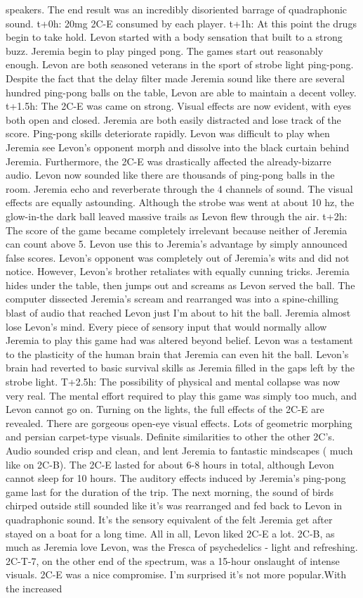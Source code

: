 \documentclass[12pt]{book}
\begin{document}
speakers. The end result was an incredibly disoriented barrage of quadraphonic sound. t+0h: 20mg 2C-E consumed by each player. t+1h: At this point the drugs begin to take hold. Levon started with a body sensation that built to a strong buzz. Jeremia begin to play pinged pong. The games start out reasonably enough. Levon are both seasoned veterans in the sport of strobe light ping-pong. Despite the fact that the delay filter made Jeremia sound like there are several hundred ping-pong balls on the table, Levon are able to maintain a decent volley. t+1.5h: The 2C-E was came on strong. Visual effects are now evident, with eyes both open and closed. Jeremia are both easily distracted and lose track of the score. Ping-pong skills deteriorate rapidly. Levon was difficult to play when Jeremia see Levon's opponent morph and dissolve into the black curtain behind Jeremia. Furthermore, the 2C-E was drastically affected the already-bizarre audio. Levon now sounded like there are thousands of ping-pong balls in the room. Jeremia echo and reverberate through the 4 channels of sound. The visual effects are equally astounding. Although the strobe was went at about 10 hz, the glow-in-the dark ball leaved massive trails as Levon flew through the air. t+2h: The score of the game became completely irrelevant because neither of Jeremia can count above 5. Levon use this to Jeremia's advantage by simply announced false scores. Levon's opponent was completely out of Jeremia's wits and did not notice. However, Levon's brother retaliates with equally cunning tricks. Jeremia hides under the table, then jumps out and screams as Levon served the ball. The computer dissected Jeremia's scream and rearranged was into a spine-chilling blast of audio that reached Levon just I'm about to hit the ball. Jeremia almost lose Levon's mind. Every piece of sensory input that would normally allow Jeremia to play this game had was altered beyond belief. Levon was a testament to the plasticity of the human brain that Jeremia can even hit the ball. Levon's brain had reverted to basic survival skills as Jeremia filled in the gaps left by the strobe light. T+2.5h: The possibility of physical and mental collapse was now very real. The mental effort required to play this game was simply too much, and Levon cannot go on. Turning on the lights, the full effects of the 2C-E are revealed. There are gorgeous open-eye visual effects. Lots of geometric morphing and persian carpet-type visuals. Definite similarities to other the other 2C's. Audio sounded crisp and clean, and lent Jeremia to fantastic mindscapes ( much like on 2C-B). The 2C-E lasted for about 6-8 hours in total, although Levon cannot sleep for 10 hours. The auditory effects induced by Jeremia's ping-pong game last for the duration of the trip. The next morning, the sound of birds chirped outside still sounded like it's was rearranged and fed back to Levon in quadraphonic sound. It's the sensory equivalent of the felt Jeremia get after stayed on a boat for a long time. All in all, Levon liked 2C-E a lot. 2C-B, as much as Jeremia love Levon, was the Fresca of psychedelics - light and refreshing. 2C-T-7, on the other end of the spectrum, was a 15-hour onslaught of intense visuals. 2C-E was a nice compromise. I'm surprised it's not more popular.With the increased 
\end{document}
